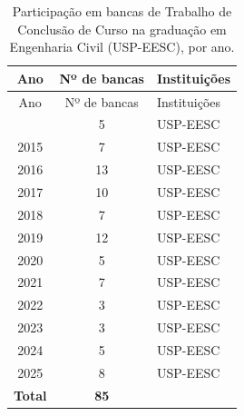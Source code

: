 \documentclass[
  brazilian,
  11pt,
  a4paper,
]{article}
\begin{document}
\begin{longtable}[]{@{}ccl@{}}
\caption{Participação em bancas de Trabalho de Conclusão de Curso na
graduação em Engenharia Civil (USP-EESC), por
ano.}\label{tab:tcc}\tabularnewline
\toprule\noalign{}
Ano & Nº de bancas & Instituições \\
\midrule\noalign{}
\endfirsthead
\toprule\noalign{}
Ano & Nº de bancas & Instituições \\
\midrule\noalign{}
\endhead
\bottomrule\noalign{}
\endlastfoot
2014 & 5 & USP-EESC \\
2015 & 7 & USP-EESC \\
2016 & 13 & USP-EESC \\
2017 & 10 & USP-EESC \\
2018 & 7 & USP-EESC \\
2019 & 12 & USP-EESC \\
2020 & 5 & USP-EESC \\
2021 & 7 & USP-EESC \\
2022 & 3 & USP-EESC \\
2023 & 3 & USP-EESC \\
2024 & 5 & USP-EESC \\
2025 & 8 & USP-EESC \\
\textbf{Total} & \textbf{85} & \\
\end{longtable}
\end{document}
